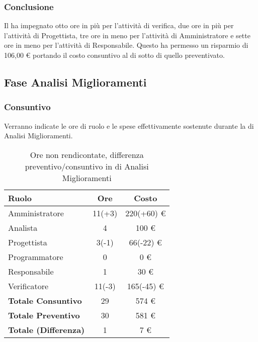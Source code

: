 \subsubsection{Conclusione}
Il  ha impegnato otto ore in pi\`u per l'attivit\`a di verifica, due ore in pi\`u per l'attivit\`a di Progettista, tre ore in meno per l'attivit\`a di Amministratore e sette ore in meno per l'attivit\`a di Responsabile. Questo ha permesso un risparmio di 106,00 \euro{} portando il costo consuntivo al di sotto di quello preventivato.

\newpage


\subsection{Fase Analisi Miglioramenti}
\subsubsection{Consuntivo}
Verranno indicate le ore di ruolo e le spese effettivamente sostenute durante la  di Analisi Miglioramenti.

\begin{table}[H]
	\centering
	\begin{tabular}{ l c c }
		\textbf{Ruolo} & \textbf{Ore} & \textbf{Costo} \\
		\hline
		Amministratore & 11(+3) & 220(+60) \euro{} \\
		Analista & 4 & 100 \euro{} \\
		Progettista & 3(-1) & 66(-22) \euro{} \\
		Programmatore & 0 & 0 \euro{} \\
		Responsabile & 1 & 30 \euro{} \\
		Verificatore & 11(-3) & 165(-45) \euro{} \\
		\hline
		\textbf{Totale Consuntivo} & 29 & 574 \euro{} \\
		\hline
		\textbf{Totale Preventivo} & 30 & 581 \euro{} \\
		\hline
		\textbf{Totale (Differenza)} & 1 & 7 \euro{} \\
		\hline
	\end{tabular}
	\caption{Ore non rendicontate, differenza preventivo/consuntivo in  di Analisi Miglioramenti}
\end{table}



